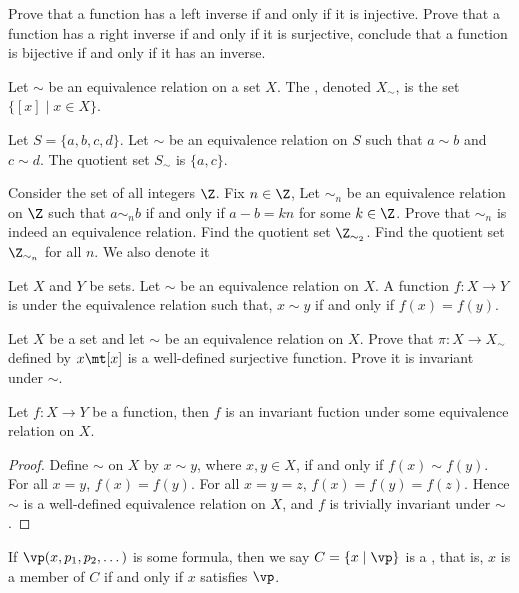 \documentclass[10pt]{article}
\begin{document}
\begin{problem}
    Prove that a function has a left inverse if and only if it is injective. Prove that a function has a right inverse if and only if it is surjective, conclude that a function is bijective if and only if it has an inverse.
\end{problem}
\begin{definition}
    Let $\sim$ be an equivalence relation on a set $X$. The , denoted ${X}_{\sim}$, is the set $\{[x]\mid x\in X\}$.
\end{definition}
\begin{example}
    Let $S=\{a,b,c,d\}$. Let $\sim$ be an equivalence relation on $S$ such that $a\sim b$ and $c\sim d$. The quotient set ${S}_{\sim}$ is $\{a,c\}$.
\end{example}
\begin{problem}
    Consider the set of all integers $\Z$. Fix $n\in\Z$, Let ${\sim}_{n}$ be an equivalence relation on $\Z$ such that $a{\sim}_{n}b$ if and only if $a-b=kn$ for some $k\in\Z$. Prove that ${\sim}_{n}$ is indeed an equivalence relation. Find the quotient set ${\Z}_{{\sim}_{2}}$. Find the quotient set ${\Z}_{{\sim}_{n}}$ for all $n$. We also denote it 
\end{problem}
\begin{definition}
    Let $X$ and $Y$ be sets. Let $\sim$ be an equivalence relation on $X$. A function $f:X\to Y$ is  under the equivalence relation such that, $x\sim y$ if and only if $f(x)=f(y)$.
\end{definition}
\begin{problem}
    Let $X$ be a set and let $\sim$ be an equivalence relation on $X$. Prove that $\pi:X\to{X}_{\sim}$ defined by $x\mt[x]$ is a well-defined surjective function. Prove it is invariant under $\sim$.
\end{problem}
\begin{proposition}
    Let $f:X\to Y$ be a function, then $f$ is an invariant fuction under some equivalence relation on $X$.
\end{proposition}
\begin{proof}
    Define $\sim$ on $X$ by $x\sim y$, where $x,y\in X$, if and only if $f(x)\sim f(y)$. For all $x=y$, $f(x)=f(y)$. For all $x=y=z$, $f(x)=f(y)=f(z)$. Hence $\sim$ is a well-defined equivalence relation on $X$, and $f$ is trivially invariant under $\sim$.
\end{proof}
\begin{definition}
    If $\vp(x,{p}_{1},{p}_{2},\dots)$ is some formula, then we say $C=\{x\mid\vp\}$ is a , that is, $x$ is a member of $C$ if and only if $x$ satisfies $\vp$.
\end{definition}
\end{document}
